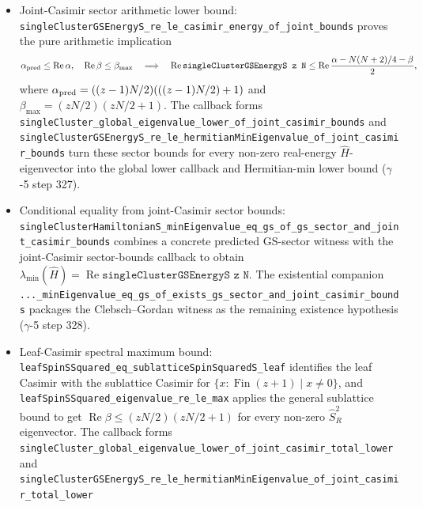 \documentclass[a4paper,11pt]{article}
\begin{document}
\begin{itemize}
        and the corresponding witness / existential equality wrappers
        reduce the remaining lower-bound work to proving that
        joint-Casimir callback and its sector arithmetic bound
        ($\gamma$-5 step 326).
  \item Joint-Casimir sector arithmetic lower bound:
        \texttt{singleClusterGSEnergyS\_re\_le\_casimir\_energy\_of\_joint\_bounds}
        proves the pure arithmetic implication
        \[
          \alpha_{\rm pred} \le \operatorname{Re}\alpha,\quad
          \operatorname{Re}\beta \le \beta_{\max}
          \quad\Longrightarrow\quad
          \operatorname{Re}\texttt{singleClusterGSEnergyS z N}
          \le
          \operatorname{Re}\frac{\alpha - N(N+2)/4 - \beta}{2},
        \]
        where
        $\alpha_{\rm pred} = ((z-1)N/2)(((z-1)N/2)+1)$ and
        $\beta_{\max} = (zN/2)(zN/2+1)$.  The callback forms
        \texttt{singleCluster\_global\_eigenvalue\_lower\_of\_joint\_casimir\_bounds}
        and
        \texttt{singleClusterGSEnergyS\_re\_le\_hermitianMinEigenvalue\_of\_joint\_casimir\_bounds}
        turn these sector bounds for every non-zero real-energy
        $\hat H$-eigenvector into the global lower callback and
        Hermitian-min lower bound ($\gamma$-5 step 327).
  \item Conditional equality from joint-Casimir sector bounds:
        \texttt{singleClusterHamiltonianS\_minEigenvalue\_eq\_gs\_of\_gs\_sector\_and\_joint\_casimir\_bounds}
        combines a concrete predicted GS-sector witness with the
        joint-Casimir sector-bounds callback to obtain
        $\lambda_{\min}(\hat H)=
        \operatorname{Re}\texttt{singleClusterGSEnergyS z N}$.
        The existential companion
        \texttt{...\_minEigenvalue\_eq\_gs\_of\_exists\_gs\_sector\_and\_joint\_casimir\_bounds}
        packages the Clebsch--Gordan witness as the remaining
        existence hypothesis ($\gamma$-5 step 328).
  \item Leaf-Casimir spectral maximum bound:
        \texttt{leafSpinSSquared\_eq\_sublatticeSpinSquaredS\_leaf}
        identifies the leaf Casimir with the sublattice Casimir for
        $\{x:\operatorname{Fin}(z+1)\mid x\ne 0\}$, and
        \texttt{leafSpinSSquared\_eigenvalue\_re\_le\_max}
        applies the general sublattice bound to get
        $\operatorname{Re}\beta \le (zN/2)(zN/2+1)$ for every
        non-zero $\hat S_R^2$ eigenvector.  The callback forms
        \texttt{singleCluster\_global\_eigenvalue\_lower\_of\_joint\_casimir\_total\_lower}
        and
        \texttt{singleClusterGSEnergyS\_re\_le\_hermitianMinEigenvalue\_of\_joint\_casimir\_total\_lower}

\end{itemize}
\end{document}

